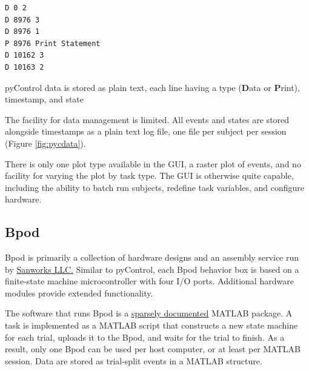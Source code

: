 \begin{marginfigure}[-0.4cm]
\begin{verbatim}
D 0 2
D 8976 3
D 8976 1
P 8976 Print Statement
D 10162 3
D 10163 2
\end{verbatim}
\caption{pyControl data is stored as plain text, each line having a type (\textbf{D}ata or \textbf{P}rint), timestamp, and state}
\label{fig:pycdata}
\end{marginfigure}

The facility for data management is limited. All events and states are stored alongside timestamps as a plain text log file, one file per subject per session (Figure \ref{fig:pycdata}).

There is only one plot type available in the GUI, a raster plot of events, and no facility for varying the plot by task type. The GUI is otherwise quite capable, including the ability to batch run subjects, redefine task variables, and configure hardware.\\

\subsection{Bpod}

Bpod is primarily a collection of hardware designs and an assembly service run by \href{https://www.sanworks.io/about/about.php}{Sanworks LLC.} Similar to pyControl, each Bpod behavior box is based on a finite-state machine microcontroller with four I/O ports. Additional hardware modules provide extended functionality.

The software that runs Bpod is a \href{https://sites.google.com/site/bpoddocumentation/bpod-user-guide/function-reference-beta}{sparsely documented} MATLAB package. A task is implemented as a MATLAB script that constructs a new state machine for each trial, uploads it to the Bpod, and waits for the trial to finish. As a result, only one Bpod can be used per host computer, or at least per MATLAB session. Data are stored as trial-split events in a MATLAB structure.

